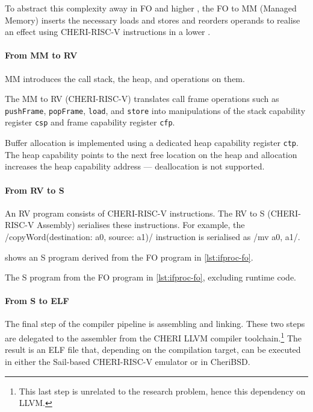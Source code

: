 \documentclass[main.tex]{subfiles}
\begin{document}
To abstract this complexity away in FO and higher , the FO to MM (Managed Memory)  inserts the necessary loads and stores and reorders operands to realise an effect using CHERI-RISC-V instructions in a lower .

\paragraph{From MM to RV} MM introduces the call stack, the heap, and operations on them.

The MM to RV (CHERI-RISC-V)  translates call frame operations such as \texttt{pushFrame}, \texttt{popFrame}, \texttt{load}, and \texttt{store} into manipulations of the stack capability register \texttt{csp} and frame capability register \texttt{cfp}.

Buffer allocation is implemented using a dedicated heap capability register \texttt{ctp}. The heap capability points to the next free location on the heap and allocation increases the heap capability address — deallocation is not supported.

\paragraph{From RV to S} An RV program consists of CHERI-RISC-V instructions. The RV to S (CHERI-RISC-V Assembly)  serialises these instructions. For example, the \iil/copyWord(destination: a0, source: a1)/ instruction is serialised as \iasm/mv a0, a1/.

 shows an S program derived from the FO program in \cref{lst:ifproc-fo}.

\begin{listing}[ht]
	\caption{The S program from the FO program in \cref{lst:ifproc-fo}, excluding runtime code.}
	\label{lst:ifproc-s}
\end{listing}

\paragraph{From S to ELF} The final step of the compiler pipeline is assembling and linking. These two steps are delegated to the assembler from the CHERI LLVM compiler toolchain.\footnote{This last step is unrelated to the research problem, hence this dependency on LLVM.} The result is an ELF file that, depending on the compilation target, can be executed in either the Sail-based CHERI-RISC-V emulator or in CheriBSD.

\biblio{}
\onlyinsubfile{\glsaddall\printglossaries}
\end{document}
